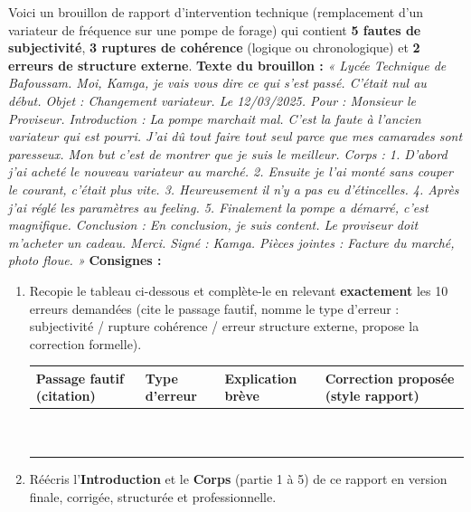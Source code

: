 \documentclass[11pt]{article}
\begin{document}
\begin{exercice}
Voici un brouillon de rapport d'intervention technique (remplacement d'un variateur de fréquence sur une pompe de forage) qui contient \textbf{5 fautes de subjectivité}, \textbf{3 ruptures de cohérence} (logique ou chronologique) et \textbf{2 erreurs de structure externe}.
\textbf{Texte du brouillon :}
\textit{« Lycée Technique de Bafoussam. Moi, Kamga, je vais vous dire ce qui s'est passé. C'était nul au début.
Objet : Changement variateur.
Le 12/03/2025. Pour : Monsieur le Proviseur.
Introduction : La pompe marchait mal. C'est la faute à l'ancien variateur qui est pourri. J'ai dû tout faire tout seul parce que mes camarades sont paresseux. Mon but c'est de montrer que je suis le meilleur.
Corps : 1. D'abord j'ai acheté le nouveau variateur au marché. 2. Ensuite je l'ai monté sans couper le courant, c'était plus vite. 3. Heureusement il n'y a pas eu d'étincelles. 4. Après j'ai réglé les paramètres au feeling. 5. Finalement la pompe a démarré, c'est magnifique.
Conclusion : En conclusion, je suis content. Le proviseur doit m'acheter un cadeau. Merci.
Signé : Kamga. Pièces jointes : Facture du marché, photo floue. »}
\textbf{Consignes :}
\begin{enumerate}
    \item Recopie le tableau ci-dessous et complète-le en relevant \textbf{exactement} les 10 erreurs demandées (cite le passage fautif, nomme le type d'erreur : subjectivité / rupture cohérence / erreur structure externe, propose la correction formelle).
    \begin{center}
    \begin{tabularx}{\linewidth}{|X|X|X|X|}\hline
    \textbf{Passage fautif (citation)} & \textbf{Type d'erreur} & \textbf{Explication brève} & \textbf{Correction proposée (style rapport)} \\ \hline
     &  &  &  \\ \hline
     &  &  &  \\ \hline
     &  &  &  \\ \hline
     &  &  &  \\ \hline
     &  &  &  \\ \hline
     &  &  &  \\ \hline
     &  &  &  \\ \hline
     &  &  &  \\ \hline
     &  &  &  \\ \hline
     &  &  &  \\ \hline
    \end{tabularx}
    \end{center}
    \item Réécris l'\textbf{Introduction} et le \textbf{Corps} (partie 1 à 5) de ce rapport en version finale, corrigée, structurée et professionnelle.
\end{enumerate}
\end{exercice}
\end{document}
